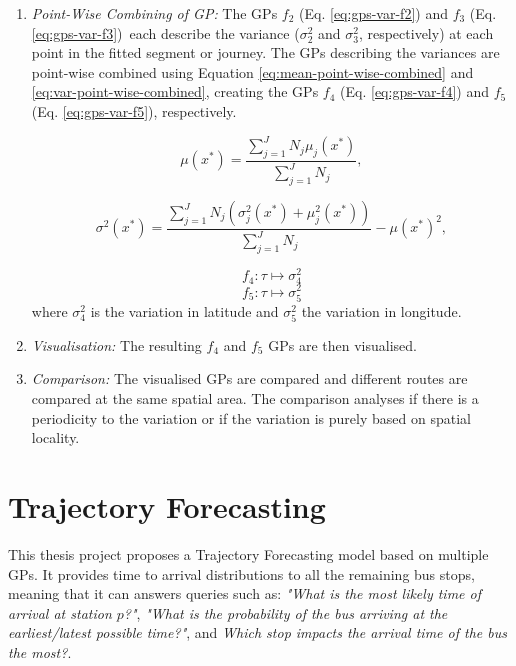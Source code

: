 \begin{enumerate}
    \item \textit{Point-Wise Combining of GP:}
    The GPs $f_2$ (Eq. \ref{eq:gps-var-f2}) and $f_3$ (Eq. \ref{eq:gps-var-f3}) each describe the variance ($\sigma_2^2$ and $\sigma_3^2$, respectively) at each point in the fitted segment or journey.
    The GPs describing the variances are point-wise combined using Equation \ref{eq:mean-point-wise-combined} and \ref{eq:var-point-wise-combined}, creating the GPs $f_4$ (Eq. \ref{eq:gps-var-f4}) and $f_5$ (Eq. \ref{eq:gps-var-f5}), respectively.
    
    \begin{equation} \label{eq:mean-point-wise-combined}
        \mu(x^*) = \frac{\sum_{j=1}^{J} N_j\mu_j(x^*)}{\sum_{j=1}^{J} N_j},
    \end{equation}

    \begin{equation} \label{eq:var-point-wise-combined}
        \sigma^2(x^*) = \frac{\sum_{j=1}^{J} N_j(\sigma_j^2(x^*) + \mu_j^2(x^*))}{\sum_{j=1}^{J} N_j} - \mu(x^*)^2,
    \end{equation}

    \begin{equation} \label{eq:gps-var-f4}
        f_4: \tau \longmapsto \sigma_4^2
    \end{equation}
    \begin{equation} \label{eq:gps-var-f5}
        f_5: \tau \longmapsto \sigma_5^2
    \end{equation}
    where $\sigma_4^2$ is the variation in latitude and $\sigma_5^2$ the variation in longitude.

    \item \textit{Visualisation:}
    The resulting $f_4$ and $f_5$ GPs are then visualised. 

    \item \textit{Comparison:}
    The visualised GPs are compared and different routes are compared at the same spatial area.
    The comparison analyses if there is a periodicity to the variation or if the variation is purely based on spatial locality.
\end{enumerate}  

\section{Trajectory Forecasting}
This thesis project proposes a Trajectory Forecasting model based on multiple GPs.
It provides time to arrival distributions to all the remaining bus stops, meaning that it can answers queries such as:
\textit{"What is the most likely time of arrival at station $p$?"}, \textit{"What is the probability of the bus arriving at the earliest/latest possible time?"}, and \textit{Which stop impacts the arrival time of the bus the most?}.

